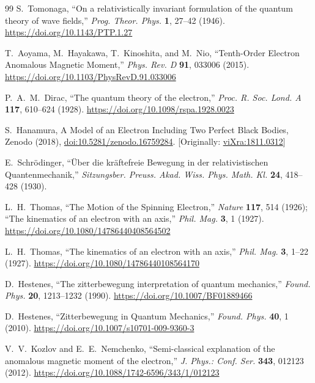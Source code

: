 \documentclass[%
 reprint,
 amsmath,amssymb,
 aps,
]{revtex4-1}
\numberwithin{equation}{section}%
\begin{document}
\begin{thebibliography}{99}
S.~Tomonaga, 
``On a relativistically invariant formulation of the quantum theory of wave fields,'' 
\textit{Prog. Theor. Phys.} \textbf{1}, 27--42 (1946). 
\href{https://doi.org/10.1143/PTP.1.27}{https://doi.org/10.1143/PTP.1.27}

T.~Aoyama, M.~Hayakawa, T.~Kinoshita, and M.~Nio, 
``Tenth-Order Electron Anomalous Magnetic Moment,'' 
\textit{Phys. Rev. D} \textbf{91}, 033006 (2015). 
\href{https://doi.org/10.1103/PhysRevD.91.033006}{https://doi.org/10.1103/PhysRevD.91.033006}

P.~A.~M.~Dirac, 
``The quantum theory of the electron,'' 
\textit{Proc. R. Soc. Lond. A} \textbf{117}, 610--624 (1928). 
\href{https://doi.org/10.1098/rspa.1928.0023}{https://doi.org/10.1098/rspa.1928.0023}

S.~Hanamura, A Model of an Electron Including Two Perfect Black Bodies, Zenodo (2018), \href{https://doi.org/10.5281/zenodo.16759284}{doi:10.5281/zenodo.16759284}. [Originally: \href{https://vixra.org/abs/1811.0312}{viXra:1811.0312}]

E.~Schr{\"o}dinger, 
``{\"U}ber die kr{\"a}ftefreie Bewegung in der relativistischen Quantenmechanik,'' 
\textit{Sitzungsber. Preuss. Akad. Wiss. Phys. Math. Kl.} \textbf{24}, 418--428 (1930).

L.~H.~Thomas, 
``The Motion of the Spinning Electron,'' 
\textit{Nature} \textbf{117}, 514 (1926); 
``The kinematics of an electron with an axis,''
\textit{Phil. Mag.} \textbf{3}, 1 (1927). 
\href{https://doi.org/10.1080/14786440408564502}{https://doi.org/10.1080/14786440408564502}

L.~H.~Thomas, 
``The kinematics of an electron with an axis,'' 
\textit{Phil. Mag.} \textbf{3}, 1--22 (1927). 
\href{https://doi.org/10.1080/14786440108564170}{https://doi.org/10.1080/14786440108564170}

D.~Hestenes, 
``The zitterbewegung interpretation of quantum mechanics,'' 
\textit{Found. Phys.} \textbf{20}, 1213--1232 (1990). 
\href{https://doi.org/10.1007/BF01889466}{https://doi.org/10.1007/BF01889466}

D.~Hestenes, 
``Zitterbewegung in Quantum Mechanics,'' 
\textit{Found. Phys.} \textbf{40}, 1 (2010). 
\href{https://doi.org/10.1007/s10701-009-9360-3}{https://doi.org/10.1007/s10701-009-9360-3}

V.~V.~Kozlov and E.~E.~Nemchenko, 
``Semi-classical explanation of the anomalous magnetic moment of the electron,'' 
\textit{J. Phys.: Conf. Ser.} \textbf{343}, 012123 (2012).
\href{https://doi.org/10.1088/1742-6596/343/1/012123}{https://doi.org/10.1088/1742-6596/343/1/012123}


\end{thebibliography}
\end{document}
